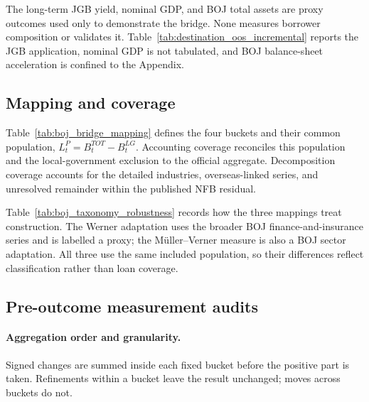 \documentclass[11pt]{article}
\begin{document}
The long-term JGB yield, nominal GDP, and BOJ total assets are proxy outcomes
used only to demonstrate the bridge. None measures borrower composition or
validates it. Table~\ref{tab:destination_oos_incremental} reports the JGB
application, nominal GDP is not tabulated, and BOJ balance-sheet acceleration
is confined to the Appendix.

\subsection{Mapping and coverage}


Table~\ref{tab:boj_bridge_mapping} defines the four buckets and their common
population, \(L_t^P=B_t^{TOT}-B_t^{LG}\). Accounting coverage reconciles this
population and the local-government exclusion to the official aggregate.
Decomposition coverage accounts for the detailed industries, overseas-linked
series, and unresolved remainder within the published NFB residual.


Table~\ref{tab:boj_taxonomy_robustness} records how the three mappings treat
construction. The Werner adaptation uses the broader BOJ finance-and-insurance
series and is labelled a proxy; the M\"uller--Verner measure is also a BOJ
sector adaptation. All three use the same included population, so their
differences reflect classification rather than loan coverage.

\subsection{Pre-outcome measurement audits}

\paragraph{Aggregation order and granularity.}
Signed changes are summed inside each fixed bucket before the positive part is
taken. Refinements within a bucket leave the result unchanged; moves across
buckets do not.
\end{document}
